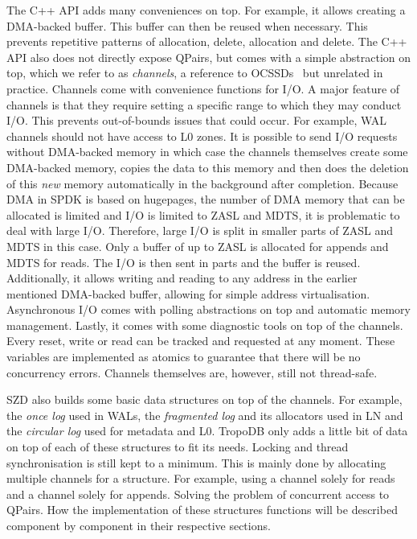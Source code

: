 The C++ API adds many conveniences on top. For example, it allows creating a DMA-backed buffer. This buffer can then be reused when necessary. This prevents repetitive patterns of allocation, delete, allocation and delete. The C++ API also does not directly expose QPairs, but comes with a simple abstraction on top, which we refer to as \textit{channels}, a reference to OCSSDs~\cite{bjorling2017lightnvm} but unrelated in practice. Channels come with convenience functions for I/O. A major feature of channels is that they require setting a specific range to which they may conduct I/O. This prevents out-of-bounds issues that could occur. For example, WAL channels should not have access to L0 zones. It is possible to send I/O requests without DMA-backed memory in which case the channels themselves create some DMA-backed memory, copies the data to this memory and then does the deletion of this \textit{new} memory automatically in the background after completion. Because DMA in SPDK is based on hugepages, the number of DMA memory that can be allocated is limited and I/O is limited to ZASL and MDTS, it is problematic to deal with large I/O. Therefore, large I/O is split in smaller parts of ZASL and MDTS in this case. Only a buffer of up to ZASL is allocated for appends and MDTS for reads. The I/O is then sent in parts and the buffer is reused.  Additionally, it allows writing and reading to any address in the earlier mentioned DMA-backed buffer, allowing for simple address virtualisation. Asynchronous I/O comes with polling abstractions on top and automatic memory management. Lastly, it comes with some diagnostic tools on top of the channels. Every reset, write or read can be tracked and requested at any moment. These variables are implemented as atomics to guarantee that there will be no concurrency errors. Channels themselves are, however, still not thread-safe.

SZD also builds some basic data structures on top of the channels. For example, the \textit{once log} used in WALs, the \textit{fragmented log} and its allocators used in LN and the \textit{circular log} used for metadata and L0. TropoDB only adds a little bit of data on top of each of these structures to fit its needs. Locking and thread synchronisation is still kept to a minimum. This is mainly done by allocating multiple channels for a structure. For example, using a channel solely for reads and a channel solely for appends. Solving the problem of concurrent access to QPairs. How the implementation of these structures functions will be described component by component in their respective sections.

